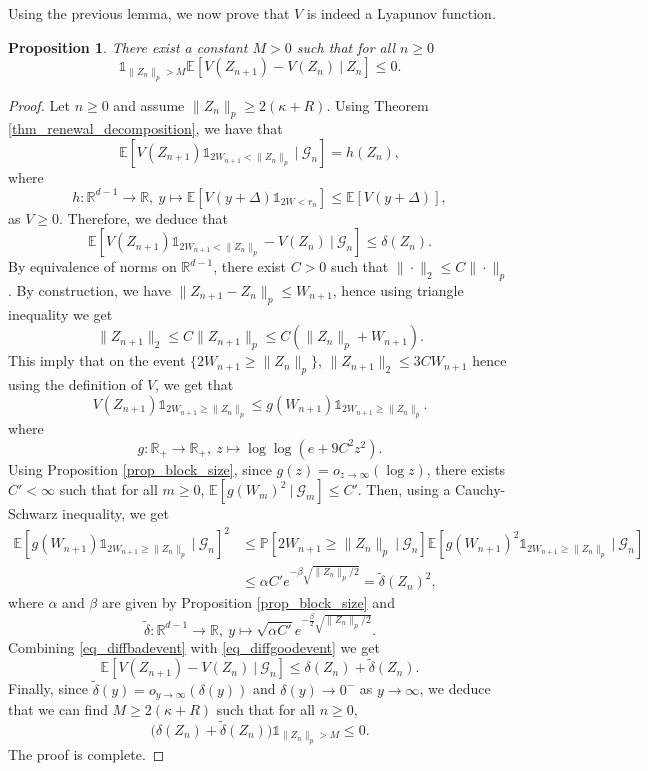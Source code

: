 \documentclass[a4paper, 11pt]{article}
\theoremstyle{plain}
\newtheorem{Proposition}[Theorem]{Proposition}
\theoremstyle{definition}
\newcommand{\E}{\mathbb{E}}
\newcommand{\R}{\mathbb{R}}
\renewcommand{\P}{\mathbb{P}}
\numberwithin{equation}{section}
\begin{document}
Using the previous lemma, we now prove that $V$ is indeed a Lyapunov function.


\begin{Proposition}
    \label{prop_lyapounov}
    There exist a constant $M>0$ such that for all $n\geq0$ 
        \[\mathds 1_{\|Z_n\|_p>M}\E[V(Z_{n+1})-V(Z_n)~\vert~Z_n]\leq0.\]
\end{Proposition}

\begin{proof}
    Let $n\geq 0$ and assume $\|Z_n\|_p\geq 2(\kappa+R)$. Using Theorem \ref{thm_renewal_decomposition}, we have that
        \[\E[V(Z_{n+1})\mathds 1_{2W_{n+1}<\|Z_n\|_p}~|~\mathcal G_n]=h(Z_n),\]
    where
        \[h:\R^{d-1}\to\R,~y\mapsto\E[V(y+\Delta)\mathds 1_{2W<r_n}]\leq\E[V(y+\Delta)],\]
    as $V\geq0$. Therefore, we deduce that
        \begin{equation}
            \label{eq_diffgoodevent}
            \E[V(Z_{n+1})\mathds 1_{2W_{n+1}<\|Z_n\|_p}-V(Z_n)~|~\mathcal G_n]\leq\delta(Z_n).
        \end{equation}
    By equivalence of norms on $\R^{d-1}$, there exist $C>0$ such that $\|\cdot\|_2\leq C\|\cdot\|_p$. By construction, we have $\|Z_{n+1}-Z_n\|_p\leq W_{n+1}$, hence using triangle inequality we get
        \[\|Z_{n+1}\|_2\leq C\|Z_{n+1}\|_p\leq C(\|Z_n\|_p+W_{n+1}).\]
    This imply that on the event $\{2W_{n+1}\geq\|Z_n\|_p\}$, $\|Z_{n+1}\|_2\leq 3CW_{n+1}$ hence using the definition of $V$, we get that
        \[V(Z_{n+1})\mathds 1_{2W_{n+1}\geq\|Z_n\|_p}\leq g(W_{n+1})\mathds 1_{2W_{n+1}\geq\|Z_n\|_p}.\]
    where
        \[g:\R_+\to\R_+,~z\mapsto\log\log(e+9C^2z^2).\]
    Using Proposition \ref{prop_block_size}, since $g(z)=o_{z\to\infty}(\log z)$, there exists $C'<\infty$ such that for all $m\geq 0$, $\E[g(W_m)^2~|~\mathcal G_m]\leq C'$. Then, using a Cauchy-Schwarz inequality, we get
        \begin{equation}
            \begin{split}
                \label{eq_diffbadevent}
                \E[g(W_{n+1})\mathds 1_{2W_{n+1}\geq \|Z_n\|_p}~|~\mathcal G_n]^2&\leq\P[2W_{n+1}\geq\|Z_n\|_p~|~\mathcal G_n]\E[g(W_{n+1})^2\mathds 1_{2W_{n+1}\geq\|Z_n\|_p}~|~\mathcal G_n]\\
                &\leq\alpha C'e^{-\beta\sqrt{\|Z_n\|_p/2}}=\tilde\delta(Z_n)^2,
            \end{split}
        \end{equation}
    where $\alpha$ and $\beta$ are given by Proposition \ref{prop_block_size} and 
        \[\tilde\delta:\R^{d-1}\to\R,~y\mapsto\sqrt{\alpha C'}e^{-\frac{\beta}{2}\sqrt{\|Z_n\|_p/2}}.\]
    Combining \eqref{eq_diffbadevent} with \eqref{eq_diffgoodevent} we get
        \[\E[V(Z_{n+1})-V(Z_n)~|~\mathcal G_n]\leq \delta(Z_n)+\tilde\delta(Z_n).\]
    Finally, since $\tilde\delta(y)=o_{y\to\infty}(\delta(y))$ and $\delta(y)\to 0^-$ as $y\to\infty$, we deduce that we can find $M\geq2(\kappa+R)$ such that for all $n\geq 0$, 
        \[\big(\delta(Z_n)+\tilde\delta(Z_n)\big)\mathds 1_{\|Z_n\|_p>M}\leq 0.\]
    The proof is complete.
    

\end{proof}
\end{document}
